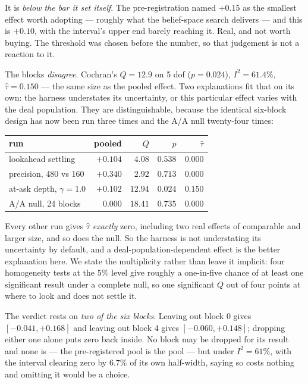 \documentclass[11pt,a4paper]{article}
\begin{document}
It is \emph{below the bar it set itself}. The pre-registration named $+0.15$ as
the smallest effect worth adopting --- roughly what the belief-space search
delivers --- and this is $+0.10$, with the interval's upper end barely reaching
it. Real, and not worth buying. The threshold was chosen before the number, so
that judgement is not a reaction to it.

The blocks \emph{disagree}. Cochran's $Q = 12.9$ on 5 dof ($p = 0.024$),
$I^2 = 61.4\%$, $\hat\tau = 0.150$ --- the same size as the pooled effect. Two
explanations fit that on its own: the harness understates its uncertainty, or
this particular effect varies with the deal population. They are distinguishable,
because the identical six-block design has now been run three times and the A/A
null twenty-four times:

\begin{center}
\small
\begin{tabular}{lrrrr}
\toprule
run & pooled & $Q$ & $p$ & $\hat\tau$ \\
\midrule
lookahead settling & $+0.104$ & $4.08$ & $0.538$ & $0.000$ \\
precision, 480 vs 160 & $+0.340$ & $2.92$ & $0.713$ & $0.000$ \\
at-ask depth, $\gamma = 1.0$ & $+0.102$ & $12.94$ & $\mathbf{0.024}$ & $\mathbf{0.150}$ \\
A/A null, 24 blocks & $0.000$ & $18.41$ & $0.735$ & $0.000$ \\
\bottomrule
\end{tabular}
\end{center}

Every other run gives $\hat\tau$ \emph{exactly} zero, including two real effects
of comparable and larger size, and so does the null. So the harness is not
understating its uncertainty by default, and a deal-population-dependent effect
is the better explanation here. We state the multiplicity rather than leave it
implicit: four homogeneity tests at the $5\%$ level give roughly a one-in-five
chance of at least one significant result under a complete null, so one
significant $Q$ out of four points at where to look and does not settle it.

The verdict rests on \emph{two of the six blocks}. Leaving out block 0 gives
$[-0.041, +0.168]$ and leaving out block 4 gives $[-0.060, +0.148]$; dropping
either one alone puts zero back inside. No block may be dropped for its result
and none is --- the pre-registered pool is the pool --- but under $I^2 = 61\%$,
with the interval clearing zero by $6.7\%$ of its own half-width, saying so costs
nothing and omitting it would be a choice.
\end{document}
